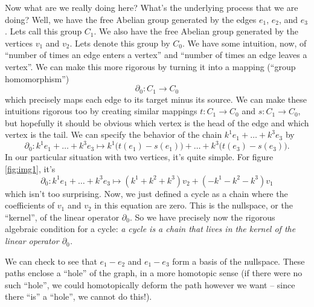 Now what are we really doing here? What's the underlying process
that we are doing?
Well, we have the free Abelian group generated
by the edges $e_{1}$, $e_{2}$, and $e_{3}$. Lets call this group
$C_{1}$. We also have the free Abelian group generated by the
vertices $v_{1}$ and $v_{2}$. Lets denote this group by
$C_{0}$. We have some intuition, now, of ``number of times an
edge enters a vertex'' and ``number of times an edge leaves a
vertex''. We can make this more rigorous by turning it into a
mapping (``group homomorphism'') 
\begin{equation}%
\partial_{0}:C_{1}\to C_{0}
\end{equation}
which precisely maps each edge to its target minus its source. We
can make these intuitions rigorous too by creating similar
mappings $t:C_{1}\to C_{0}$ and $s:C_{1}\to C_{0}$, but hopefully
it should be obvious which vertex is the head of the edge and
which vertex is the tail. We can specify the behavior of the
chain $k^{1}e_{1}+\ldots+k^{3}e_{3}$ by
\begin{equation}%
\partial_{0}:k^{1}e_{1}+\ldots+k^{3}e_{3}\mapsto k^{1}\Big(t(e_{1})-s(e_{1})\Big)
+ \ldots + k^{3}\Big(t(e_{3})-s(e_{3})\Big).
\end{equation}
In our particular situation with two vertices, it's quite
simple. For figure \ref{fig:img1}, it's
\begin{equation}%
\partial_{0}:k^{1}e_{1}+\ldots+k^{3}e_{3}\mapsto
(k^{1}+k^{2}+k^{3})v_{2} + (-k^{1}-k^{2}-k^{3})v_{1}
\end{equation}
which isn't too surprising. Now, we just defined a cycle as a
chain where the coefficients of $v_{1}$ and $v_{2}$ in this
equation are zero. This is the nullspace, or the ``kernel'', of
the linear operator $\partial_{0}$. So we have precisely now the
rigorous algebraic condition for a cycle: \emph{a cycle is a
  chain that lives in the kernel of the linear operator
  $\partial_{0}$.}

We can check to see that $e_{1}-e_{2}$ and $e_{1}-e_{3}$ form a
basis of the nullspace. These paths enclose a ``hole'' of the
graph, in a more homotopic sense (if there were no such ``hole'',
we could homotopically deform the path however we want -- since
there ``is'' a ``hole'', we cannot do this!).



